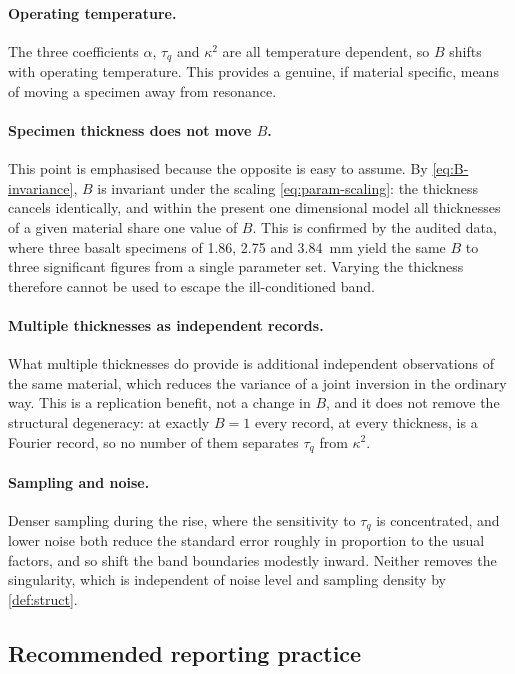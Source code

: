 \documentclass[preprint,12pt,a4paper]{elsarticle}
\theoremstyle{plain}
\theoremstyle{definition}
\theoremstyle{remark}
\newcommand{\tq}{\tau_{q}}
\newcommand{\kk}{\kappa^{2}}
\newcommand{\Bnum}{B}
\begin{document}
\paragraph{Operating temperature.}
The three coefficients $\alpha$, $\tq$ and $\kk$ are all temperature dependent,
so $\Bnum$ shifts with operating temperature. This provides a genuine, if
material specific, means of moving a specimen away from resonance.

\paragraph{Specimen thickness does not move $\Bnum$.}
This point is emphasised because the opposite is easy to assume. By
\eqref{eq:B-invariance}, $\Bnum$ is invariant under the scaling
\eqref{eq:param-scaling}: the thickness cancels identically, and within the
present one dimensional model all thicknesses of a given material share one
value of $\Bnum$. This is confirmed by the audited data, where three basalt
specimens of \SI{1.86}{}, \SI{2.75}{} and \SI{3.84}{\milli\metre} yield the
same $\Bnum$ to three significant figures from a single parameter set. Varying
the thickness therefore cannot be used to escape the ill-conditioned band.

\paragraph{Multiple thicknesses as independent records.}
What multiple thicknesses do provide is additional independent observations of
the same material, which reduces the variance of a joint inversion in the
ordinary way. This is a replication benefit, not a change in $\Bnum$, and it
does not remove the structural degeneracy: at exactly $\Bnum = 1$ every record,
at every thickness, is a Fourier record, so no number of them separates $\tq$
from $\kk$.

\paragraph{Sampling and noise.}
Denser sampling during the rise, where the sensitivity to $\tq$ is
concentrated, and lower noise both reduce the standard error roughly in
proportion to the usual factors, and so shift the band boundaries modestly
inward. Neither removes the singularity, which is independent of noise level
and sampling density by \cref{def:struct}.

\subsection{Recommended reporting practice}
\label{sec:design-recommendation}
\end{document}
